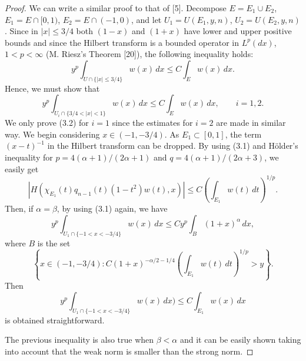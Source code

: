 \documentclass[10pt,a4paper]{article}
\theoremstyle{plain}
\theoremstyle{remark}
\begin{document}
\begin{proof}
We can write a similar proof to that of [5].
Decompose $E = E_{1} \cup E_{2}$,
$E_{1} = E \cap [0,1)$, $E_{2} = E \cap (-1,0)$, and let
$U_{1} = U(E_{1},y,n)$, $U_{2} = U(E_{2},y,n)$. Since in
$|x| \leq 3/4$ both $(1-x)$ and $(1+x)$ have lower and upper positive
bounds and since the Hilbert transform is a bounded operator
in $L^{p}(dx)$, $1 < p < \infty$ (M. Riesz's Theorem
[20]), the following inequality holds:
$$
y^{p} \int_{U \cap \{|x| \leq 3/4\}} w(x)\,dx \leq C \int_{E} w(x)\,dx.
$$
Hence, we must show that
\begin{equation}
y^{p} \int_{U_{i} \cap \{3/4 < |x| < 1\}} w(x)\,dx
\leq C \int_{E} w(x)\,dx, \qquad i = 1, 2.
\tag{3.2}
\end{equation}
We only prove (3.2) for $i = 1$ since the estimates for $i = 2$ are
made in similar way. We begin considering $x \in (-1,-3/4)$.
As $E_{1} \subset [0,1]$, the term $(x-t)^{-1}$ in the Hilbert transform
can be dropped. By using (3.1) and H\"{o}lder's inequality for
$p = 4(\alpha+1)/(2\alpha+1)$ and $q = 4(\alpha+1)/(2\alpha+3)$,
we easily get
$$
|H(\chi_{E_{1}}(t)q_{n-1}(t)(1-t^{2})w(t),x)|
\leq C \left( \int_{E_{1}} w(t)\,dt \right)^{1/p}.
$$
Then, if $\alpha = \beta$, by using (3.1) again, we have
$$
y^{p} \int_{U_{1} \cap \{-1 < x < -3/4\}} w(x)\,dx
\leq C y^{p} \int_{B} (1+x)^{\alpha}\,dx,
$$
where $B$ is the set
$$
\left\{ x \in (-1,-3/4) : C(1+x)^{-\alpha/2-1/4}
\left(\int_{E_{1}} w(t)\,dt \right)^{1/p} > y \right\}.
$$
Then
$$
y^{p} \int_{U_{1} \cap \{-1 < x < -3/4\}} w(x)\,dx)
\leq C \int_{E_{1}} w(x)\,dx
$$
is obtained straightforward.

The previous inequality is also true when $\beta < \alpha$
and it can be easily shown taking into account that the weak
norm is smaller than the strong norm.


\end{proof}
\end{document}
